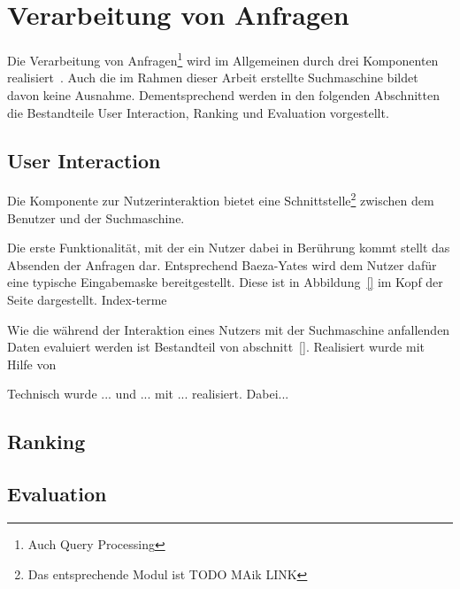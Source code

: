 \section{Verarbeitung von Anfragen}
\label{chap:query_processing}

Die Verarbeitung von Anfragen\footnote{Auch Query Processing} wird im Allgemeinen durch drei Komponenten realisiert~\cite{croft.chap2}.
Auch die im Rahmen dieser Arbeit erstellte Suchmaschine bildet davon keine Ausnahme.
Dementsprechend werden in den folgenden Abschnitten die Bestandteile User Interaction, Ranking und Evaluation vorgestellt.

\subsection{User Interaction~\cite{croft.chap2}}
\label{chap:query_processing}

Die Komponente zur Nutzerinteraktion bietet eine Schnittstelle\footnote{Das entsprechende Modul ist TODO MAik LINK} zwischen dem Benutzer und der Suchmaschine.

Die erste Funktionalität, mit der ein Nutzer dabei in Berührung kommt stellt das Absenden der Anfragen dar.
Entsprechend Baeza-Yates wird dem Nutzer dafür eine typische Eingabemaske bereitgestellt.
Diese ist in Abbildung~\ref{} im Kopf der Seite dargestellt.
Index-terme

Wie die während der Interaktion eines Nutzers mit der Suchmaschine anfallenden Daten evaluiert werden ist Bestandteil von abschnitt~\ref{}.
Realisiert wurde mit Hilfe von

Technisch wurde ... und ... mit ... realisiert.
Dabei...

\subsection{Ranking~\cite{croft.chap2}}
\label{chap:ranking}


\subsection{Evaluation~\cite{croft.chap2}}
\label{chap:evaluation}

